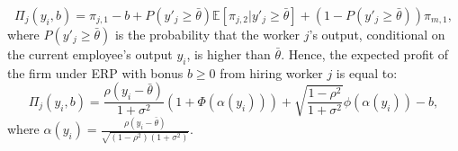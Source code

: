 \documentclass[12pt]{article}
\begin{document}
\begin{itemize}
    \begin{equation*}
        \Pi_j(y_i, b) = \pi_{j,1} - b + P\left( y'_j \geq \bar{\theta} \right) \mathbb {E}[\pi_{j,2} | y'_j \geq \bar{\theta}] 
        + (1 - P\left( y'_j \geq \bar{\theta} \right)) \pi_{m,1},
    \end{equation*}
    where $P\left( y'_j \geq \bar{\theta} \right)$ is the probability that the worker $j$'s output, conditional on the current employee's output $y_i$, is higher than $\bar{\theta}$. Hence, the expected profit of the firm under ERP with bonus $b \geq 0$ from hiring worker $j$ is equal to:
    \begin{equation}\label{eq_pi_j_y_i_b}
        \Pi_j(y_i, b) = \frac{\rho\left(y_i-\bar{\theta}\right)}{1+\sigma^2}\left(1+\Phi\left(\alpha(y_i)\right)\right)
        + \sqrt{\frac{1-\rho^2}{1+\sigma^2}}\phi\left(\alpha(y_i)\right) - b,
    \end{equation}
    where $\alpha(y_i) = \frac{\rho\left(y_i - \bar{\theta}\right)}{\sqrt{(1-\rho^2)(1+\sigma^2)}}$.
\end{itemize}
\end{document}
